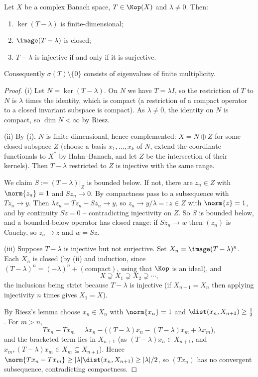 \begin{theorem}
	Let $X$ be a complex Banach space, $T\in\Kop(X)$ and $\lambda\neq0$. Then:
	\begin{enumerate}[label=(\roman*)]
		\item $\ker(T-\lambda)$ is finite-dimensional;
		\item $\image(T-\lambda)$ is closed;
		\item $T - \lambda$ is injective if and only if it is surjective.
	\end{enumerate}
	Consequently $\sigma(T)\setminus\{0\}$ consists of eigenvalues of finite multiplicity.
\end{theorem}

\begin{proof}
	(i) Let $N = \ker(T-\lambda)$. On $N$ we have $T = \lambda I$, so the restriction of $T$ to $N$ is $\lambda$ times the identity, which is compact (a restriction of a compact operator to a closed invariant subspace is compact). As $\lambda\neq0$, the identity on $N$ is compact, so $\dim N<\infty$ by Riesz.

	(ii) By (i), $N$ is finite-dimensional, hence complemented: $X = N\oplus Z$ for some closed subspace $Z$ (choose a basis $x_1,\dots,x_k$ of $N$, extend the coordinate functionals to $X^*$ by Hahn--Banach, and let $Z$ be the intersection of their kernels). Then $T - \lambda$ restricted to $Z$ is injective with the same range.

	We claim $S := (T-\lambda)|_Z$ is bounded below. If not, there are $z_n\in Z$ with $\norm{z_n}=1$ and $Sz_n\to0$. By compactness pass to a subsequence with $Tz_n \to y$. Then $\lambda z_n = Tz_n - Sz_n \to y$, so $z_n \to y/\lambda =: z \in Z$ with $\norm{z}=1$, and by continuity $Sz = 0$ -- contradicting injectivity on $Z$. So $S$ is bounded below, and a bounded-below operator has closed range: if $Sz_n \to w$ then $(z_n)$ is Cauchy, so $z_n\to z$ and $w = Sz$.

	(iii) Suppose $T-\lambda$ is injective but not surjective. Set $X_n = \image(T-\lambda)^n$. Each $X_n$ is closed (by (ii) and induction, since $(T-\lambda)^n = (-\lambda)^n + (\text{compact})$, using that $\Kop$ is an ideal), and
	$$X \supsetneq X_1\supsetneq X_2 \supsetneq\cdots,$$
	the inclusions being strict because $T-\lambda$ is injective (if $X_{n+1}=X_n$ then applying injectivity $n$ times gives $X_1 = X$).

	By Riesz's lemma choose $x_n\in X_n$ with $\norm{x_n}=1$ and $\dist(x_n, X_{n+1})\geq\frac12$. For $m>n$,
	$$Tx_n - Tx_m = \lambda x_n - \big( (T-\lambda)x_n - (T-\lambda)x_m + \lambda x_m \big),$$
	and the bracketed term lies in $X_{n+1}$ (as $(T-\lambda)x_n \in X_{n+1}$, and $x_m, (T-\lambda)x_m \in X_m \subseteq X_{n+1}$). Hence $\norm{Tx_n - Tx_m}\geq|\lambda|\dist(x_n,X_{n+1})\geq|\lambda|/2$, so $(Tx_n)$ has no convergent subsequence, contradicting compactness.


\end{proof}
